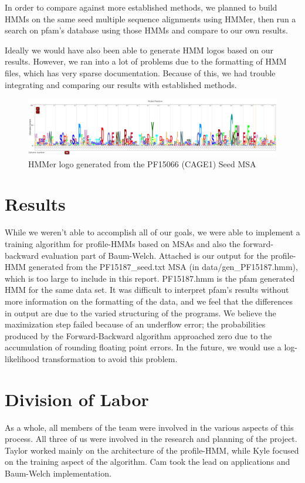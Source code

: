 \documentclass{article}
\begin{document}
In order to compare against more established methods, we planned to build HMMs on the same seed multiple sequence alignments using HMMer, then run a search on pfam's database using those HMMs and compare to our own results.

Ideally we would have also been able to generate HMM logos based on our results. However, we ran into a lot of problems due to the formatting of HMM files, which has very sparse documentation. Because of this, we had trouble integrating and comparing our results with established methods.

\begin{figure}[H]
\centering
\includegraphics[width=1.0\textwidth]{materials/HMMerLogo.png}
\caption{HMMer logo generated from the PF15066 (CAGE1) Seed MSA}
\end{figure}


\section{Results}
While we weren't able to accomplish all of our goals, we were able to implement a training algorithm for profile-HMMs based on MSAs and also the forward-backward evaluation part of Baum-Welch. Attached is our output for the profile-HMM generated from the PF15187\_seed.txt MSA (in data/gen\_PF15187.hmm), which is too large to include in this report. PF15187.hmm is the pfam generated HMM for the same data set. It was difficult to interpret pfam's results without more information on the formatting of the data, and we feel that the differences in output are due to the varied structuring of the programs. We believe the maximization step failed because of an underflow error; the probabilities produced by the Forward-Backward algorithm approached zero due to the accumulation of rounding floating point errors. In the future, we would use a log-likelihood transformation to avoid this problem.


\section{Division of Labor}
As a whole, all members of the team were involved in the various aspects of this process. All three of us were involved in the research and planning of the project. Taylor worked mainly on the architecture of the profile-HMM, while Kyle focused on the training aspect of the algorithm. Cam took the lead on applications and Baum-Welch implementation. 
\end{document}
